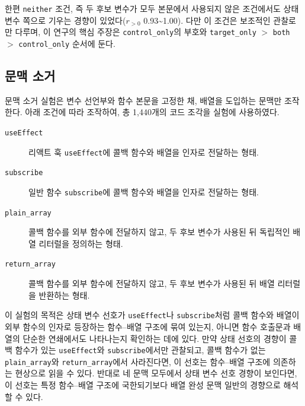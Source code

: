 \documentclass[11pt]{article}
\begin{document}
한편 \texttt{neither} 조건, 즉 두 후보 변수가 모두 본문에서 사용되지 않은 조건에서도 상태 변수 쪽으로 기우는 경향이 있었다($r_{>0}$ 0.93\~{}1.00).
다만 이 조건은 보조적인 관찰로만 다루며, 이 연구의 핵심 주장은 \texttt{control\_only}의 부호와 \texttt{target\_only} $>$ \texttt{both} $>$ \texttt{control\_only} 순서에 둔다.

\subsection{문맥 소거}
\label{sec:results-context}

문맥 소거 실험은 변수 선언부와 함수 본문을 고정한 채, 배열을 도입하는 문맥만 조작한다.
아래 조건에 따라 조작하여, 총 1,440개의 코드 조각을 실험에 사용하였다.

\begin{description}
\item[\texttt{useEffect}]
  리액트 훅 \texttt{useEffect}에 콜백 함수와 배열을 인자로 전달하는 형태.
\item[\texttt{subscribe}]
  일반 함수 \texttt{subscribe}에 콜백 함수와 배열을 인자로 전달하는 형태.
\item[\texttt{plain\_array}]
  콜백 함수를 외부 함수에 전달하지 않고, 두 후보 변수가 사용된 뒤 독립적인 배열 리터럴을 정의하는 형태.
\item[\texttt{return\_array}]
  콜백 함수를 외부 함수에 전달하지 않고, 두 후보 변수가 사용된 뒤 배열 리터럴을 반환하는 형태.
\end{description}

이 실험의 목적은 상태 변수 선호가 \texttt{useEffect}나 \texttt{subscribe}처럼 콜백 함수와 배열이 외부 함수의 인자로 등장하는 함수--배열 구조에 묶여 있는지, 아니면 함수 호출문과 배열의 단순한 연쇄에서도 나타나는지 확인하는 데에 있다.
만약 상태 선호의 경향이 콜백 함수가 있는 \texttt{useEffect}와 \texttt{subscribe}에서만 관찰되고, 콜백 함수가 없는 \texttt{plain\_array}와 \texttt{return\_array}에서 사라진다면, 이 선호는 함수--배열 구조에 의존하는 현상으로 읽을 수 있다.
반대로 네 문맥 모두에서 상태 변수 선호 경향이 보인다면, 이 선호는 특정 함수--배열 구조에 국한되기보다 배열 완성 문맥 일반의 경향으로 해석할 수 있다.
\end{document}
